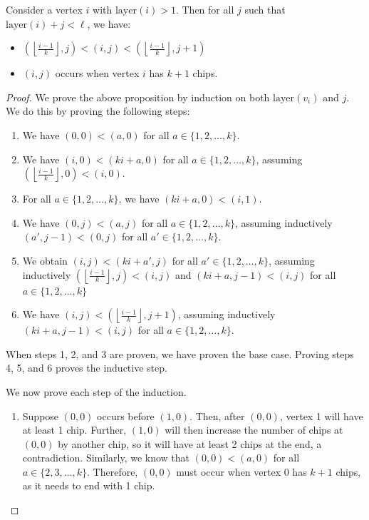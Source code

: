 \documentclass[10pt,a4paper]{amsart}
\begin{document}
\begin{theorem}\label{thm:Endgame}
Consider a vertex $i$ with $\mathrm{layer}(i) > 1$. Then for all $j$ such that $\mathrm{layer}(i)+j < \ell$, we have:

\begin{itemize}
    \item $\left( \left \lfloor \frac {i-1} k\right \rfloor, j \right) < (i,j) < \left( \left \lfloor \frac {i-1} k\right \rfloor, j+1 \right)$
    \item $(i,j)$ occurs when vertex $i$ has $k+1$ chips.
\end{itemize}
\end{theorem}

\begin{proof}
We prove the above proposition by induction on both $\mathrm{layer}(v_i)$ and $j$. We do this by proving the following steps:
\begin{enumerate}
    \item We have $(0,0) < (a, 0)$ for all $a \in \{1, 2, \dots, k\}$.
    \item We have $(i,0) < ({ki+a},0)$ for all $a \in \{1, 2, \dots, k\}$, assuming $\left ( \left \lfloor \frac {i-1} k \right \rfloor , 0 \right ) < (i,0)$.
    \item For all $a \in \{1, 2, \dots, k\}$, we have $(ki+a, 0) < (i,1)$.
    \item We have $(0,j) < (a, j)$ for all $a \in \{1, 2, \dots, k\}$, assuming inductively $(a',j-1)< (0,j)$ for all $a' \in \{1, 2, \dots, k\}$.
    \item We obtain $(i,j) < ({ki+a'}, j)$ for all $a' \in \{1,2,\dots, k\}$, assuming inductively $\left ( \left \lfloor \frac {i-1} k \right \rfloor , j \right ) < (i,j)$ and $(ki+a, j-1) < (i,j)$ for all $a \in \{1,2, \dots, k\}$
    \item We have $(i,j) < \left ({\left \lfloor \frac {i-1} k \right \rfloor}, j+1 \right)$, assuming inductively $({ki+a}, j-1) < (i,j)$ for all $a \in \{1,2, \dots, k\}$.
\end{enumerate}

When steps 1, 2, and 3 are proven, we have proven the base case. Proving steps 4, 5, and 6 proves the inductive step. 

We now prove each step of the induction.

\begin{enumerate}
    \item Suppose $(0,0)$ occurs before $(1,0)$. Then, after $(0,0)$, vertex 1 will have at least 1 chip. Further, $(1,0)$ will then increase the number of chips at $(0,0)$ by another chip, so it will have at least 2 chips at the end, a contradiction. Similarly, we know that $(0,0) < (a,0)$ for all $a \in \{2, 3, \dots, k\}$. Therefore, $(0,0)$ must occur when vertex 0 has $k+1$ chips, as it needs to end with 1 chip.


\end{enumerate}
\end{proof}
\end{document}
